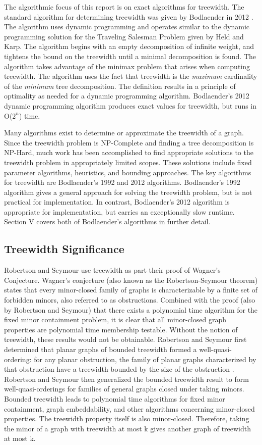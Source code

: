 \documentclass[12pt,conference]{IEEEtran}
\theoremstyle{plain}
\begin{document}
The algorithmic focus of this report is on exact algorithms for treewidth. The standard algorithm for determining treewidth was given by Bodlaender in 2012 \cite{bodlaender-2012}. The algorithm  uses dynamic programming and operates similar to the dynamic programming solution for the Traveling Salesman Problem given by Held and Karp. The algorithm begins with an empty decomposition of infinite weight, and tightens the bound on the treewidth until a minimal decomposition is found. The algorithm takes advantage of the minimax problem that arises when computing treewidth. The algorithm uses the fact that treewidth is the \textit{maximum} cardinality of the \textit{minimum} tree decomposition. The definition results in a principle of optimality as needed for a dynamic programming algorithm. Bodlaender's 2012 dynamic programming algorithm produces exact values for treewidth, but runs in O($2^{n}$) time.

Many algorithms exist to determine or approximate the treewidth of a graph. Since the treewidth problem is NP-Complete and finding a tree decomposition is NP-Hard, much work has been accomplished to find appropriate solutions to the treewidth problem in appropriately limited scopes. These solutions include fixed parameter algorithms, heuristics, and bounding approaches. The key algorithms for treewidth are Bodlaender's 1992 and 2012 algorithms. Bodlaender's 1992 algorithm gives a general approach for solving the treewidth problem, but is not practical for implementation. In contrast, Bodlaender's 2012 algorithm is appropriate for implementation, but carries an exceptionally slow runtime. Section V covers both of Bodlaender's algorithms in further detail.

\subsection{Treewidth Significance}

Robertson and Seymour use treewidth as part their proof of Wagner's Conjecture. Wagner's conjecture (also known as the Robertson-Seymour theorem) states that every minor-closed family of graphs is characterizable by a finite set of forbidden minors, also referred to as obstructions. Combined with the proof (also by Robertson and Seymour) that there exists a polynomial time algorithm for the fixed minor containment problem, it is clear that all minor-closed graph properties are polynomial time membership testable. Without the notion of treewidth, these results would not be obtainable. Robertson and Seymour first determined that planar graphs of bounded treewidth formed a well-quasi-ordering: for any planar obstruction, the family of planar graphs characterized by that obstruction have a treewidth bounded by the size of the obstruction \cite{seymour-stack-overflow}. Robertson and Seymour then generalized the bounded treewidth result to form well-quasi-orderings for families of general graphs closed under taking minors. Bounded treewidth leads to polynomial time algorithms for fixed minor containment, graph embeddability, and other algorithms concerning minor-closed properties. The treewidth property itself is also minor-closed. Therefore, taking the minor of a graph with treewidth at most k gives another graph of treewidth at most k. 
\end{document}
